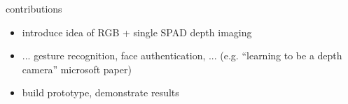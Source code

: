 
contributions
%
\begin{itemize}
	\item introduce idea of RGB + single SPAD depth imaging		
	\item ... gesture recognition, face authentication, ... (e.g. ``learning to be a depth camera'' microsoft paper)
	\item build prototype, demonstrate results		
\end{itemize}


